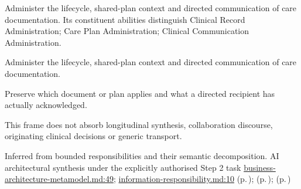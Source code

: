 Administer the lifecycle, shared-plan context and directed communication of care documentation. Its constituent abilities distinguish Clinical Record Administration; Care Plan Administration; Clinical Communication Administration.



Administer the lifecycle, shared-plan context and directed communication of care documentation.



Preserve which document or plan applies and what a directed recipient has actually acknowledged.



This frame does not absorb longitudinal synthesis, collaboration discourse, originating clinical decisions or generic transport.


Inferred from bounded responsibilities and their semantic decomposition. AI architectural synthesis under the explicitly authorised Step 2 task \hyperref[evidence:4bac85accd34ce0b]{business-architecture-metamodel.md:49}; \hyperref[evidence:be61392fefb4bb10]{information-responsibility.md:10}
 (p.\,\pageref{cap:bec-clinical-record-administration});  (p.\,\pageref{cap:bec-care-plan-administration});  (p.\,\pageref{cap:bec-clinical-communication-administration})

